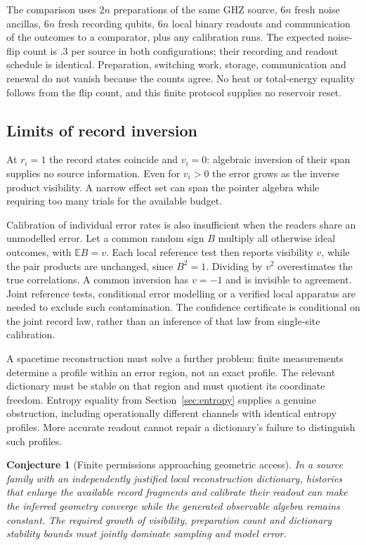 \documentclass[12pt,a4paper]{article}
\newtheorem{conjecture}[theorem]{Conjecture}
\begin{document}
The comparison uses $2n$ preparations of the same GHZ source,
$6n$ fresh noise ancillas, $6n$ fresh recording qubits, $6n$ local
binary readouts and communication of the outcomes to a comparator,
plus any calibration runs. The expected noise-flip count is $.3$
per source in both configurations; their recording and readout
schedule is identical. Preparation, switching work, storage,
communication and renewal do not vanish because the counts agree.
No heat or total-energy equality follows from the flip count, and
this finite protocol supplies no reservoir reset.

\subsection{Limits of record inversion}

At $r_i=1$ the record states coincide and $v_i=0$: algebraic inversion
of their span supplies no source information. Even for $v_i>0$ the
error grows as the inverse product visibility. A narrow effect set
can span the pointer algebra while requiring too many trials for
the available budget.

Calibration of individual error rates is also insufficient when
the readers share an unmodelled error. Let a common random sign
$B$ multiply all otherwise ideal outcomes, with $\mathbb E B=v$.
Each local reference test then reports visibility $v$, while the
pair products are unchanged, since $B^2=1$. Dividing by $v^2$
overestimates the true correlations. A common inversion has $v=-1$
and is invisible to agreement. Joint reference tests, conditional
error modelling or a verified local apparatus are needed to exclude
such contamination. The confidence certificate is conditional on
the joint record law, rather than an inference of that law from
single-site calibration.

A spacetime reconstruction must solve a further problem: finite
measurements determine a profile within an error region, not an
exact profile. The relevant dictionary must be stable on that
region and must quotient its coordinate freedom. Entropy equality
from Section~\ref{sec:entropy} supplies a genuine obstruction,
including operationally different channels with identical entropy
profiles. More accurate readout cannot repair a dictionary's
failure to distinguish such profiles.

\begin{conjecture}[Finite permissions approaching geometric access]
\label{conj:finite-geometry}
In a source family with an independently justified local
reconstruction dictionary, histories that enlarge the available
record fragments and calibrate their readout can make the inferred
geometry converge while the generated observable algebra remains
constant. The required growth of visibility, preparation count and
dictionary stability bounds must jointly dominate sampling and
model error.
\end{conjecture}
\end{document}
